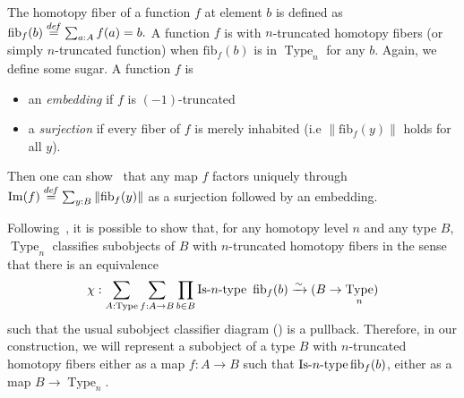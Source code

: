 \documentclass[notfinal]{jfrarticle}
\DeclareMathOperator{\Type}{Type}
\DeclareMathOperator{\im}{Im}
\newcommand \defeq {\overset{de\hspace{-0.2ex}f}{=}}
\def\mymathhyphen{{\hbox{-}}}
\newcommand{\IsType}[1]
{\mathop{\mathrm{Is\mymathhyphen}#1\mathrm{\mymathhyphen type}} }
\newcommand \fib[2] {\mathrm{fib}_{#1}(#2)}
\begin{document}
%
The homotopy fiber of a function $f$ at element $b$ is
defined as 
$
\fib{f}{b} \defeq \sum_{a:A} f(a) = b.
$
%
A function $f$ is with $n$-truncated homotopy fibers (or simply
$n$-truncated function) when $\fib{f}{b}$
is in $\Type_n$ for any $b$.  
%
Again, we define some sugar. A function $f$ is 
\begin{itemize}
\item an {\em embedding} if $f$ is $(-1)$-truncated
\item a {\em surjection} if every fiber of $f$ is merely inhabited
  (i.e $\|\fib f y\|$ holds for all $y$).
\end{itemize}
Then one can show~\cite[Lemma 7.6.4]{hottbook} that any map $f$
factors uniquely through $\im(f) \defeq \sum_{y:B} \|\fib f y\|$ as a
surjection followed by an embedding.

Following~\cite{sets_in_hott}, it is possible to show that, for any
homotopy level $n$ and any type $B$, $\Type_n$ classifies subobjects
of $B$ with $n$-truncated homotopy fibers in the sense that there is
an equivalence
%
\[
  \chi : \sum_{A:\Type} \sum_{f:A \to B} \prod_{b\in B}
\IsType n\
\fib{f}{b} \xrightarrow{\sim} 
 (B \to \Type_n)
\]
%
 such that the usual subobject
 classifier diagram (\cite[Theorem 4.8.4]{hottbook}) is a pullback.
Therefore, in our construction, we will represent a subobject of a
type $B$ with $n$-truncated homotopy fibers either as a map $f:A\to B$
such that $\IsType n \fib{f}{b}$, either as a map $B\to \Type_n$.


\end{document}
